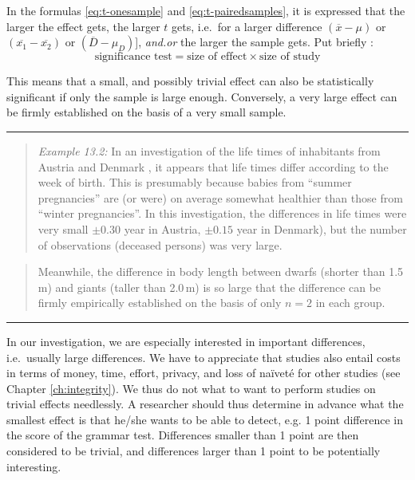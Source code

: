 \documentclass[
]{book}
\begin{document}
In the formulas \eqref{eq:t-onesample} and \eqref{eq:t-pairedsamples}, it is expressed that the larger the effect gets, the larger \(t\) gets,
i.e.~for a larger difference
\((\overline{x}-\mu)\) or \((\overline{x_1}-\overline{x_2})\) or
\((\overline{D}-\mu_D)\){]}, \emph{and.or} the larger the sample gets.
Put briefly \citep[ p.338, formula 11.10]{Rose08}:
\begin{equation}
  \label{eq:Rose08}
    \textrm{significance test} = 
    \textrm{size of effect} \times \textrm{size of study}
\end{equation}

This means
that a small, and possibly trivial effect can also be
statistically significant if only the sample is large enough.
Conversely, a very large effect can be firmly established on the basis of
a very small sample.

\begin{center}\rule{0.5\linewidth}{0.5pt}\end{center}

\begin{quote}
\emph{Example 13.2:}
In an investigation of the life times of inhabitants from Austria
and Denmark \citep{Dobl99}, it appears that life times differ according to
the week of birth. This is presumably because babies from ``summer pregnancies''
are (or were) on average somewhat healthier than those
from ``winter pregnancies''. In this investigation, the differences
in life times were very small \(\pm 0.30\) year in Austria, \(\pm 0.15\) year
in Denmark), but the number of observations (deceased persons) was very large.
\end{quote}

\begin{quote}
Meanwhile, the difference in body length between dwarfs (shorter than
1.5 m) and giants (taller than 2.0 m) is so large that the difference can be firmly
empirically established on the basis of only \(n=2\) in each group.
\end{quote}

\begin{center}\rule{0.5\linewidth}{0.5pt}\end{center}

In our investigation, we are especially interested in important
differences, i.e.~usually large differences. We have to appreciate
that studies also entail costs in terms of money, time,
effort, privacy, and loss of naïveté for other studies
(see Chapter
\ref{ch:integrity}). We thus do not what to want to perform studies
on trivial effects needlessly. A researcher should thus determine in advance
what the smallest effect is that he/she wants to be able to detect, e.g.
1 point difference in the score of the grammar test. Differences smaller than
1 point are then considered to be trivial, and differences larger than 1 point to be potentially
interesting.
\end{document}
